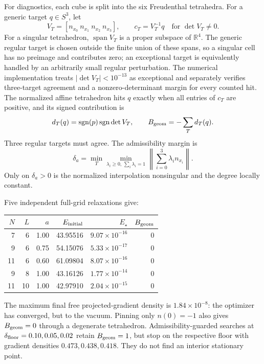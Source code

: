 \documentclass[11pt]{article}
\numberwithin{equation}{section}
\newcommand{\RR}{\mathbb R}
\begin{document}
For diagnostics, each cube is split into the six Freudenthal tetrahedra.  For
a generic target \(q\in S^3\), let
\begin{equation}
 V_T=[n_{x_0}\ n_{x_1}\ n_{x_2}\ n_{x_3}],\qquad
 c_T=V_T^{-1}q\quad\text{for }\det V_T\ne0.
\end{equation}
For a singular tetrahedron, \(\operatorname{span}V_T\) is a proper subspace
of \(\RR^4\).  The generic regular target is chosen outside the finite union
of these spans, so a singular cell has no preimage and contributes zero; an
exceptional target is equivalently handled by an arbitrarily small regular
perturbation.  The numerical implementation treats
\(|\det V_T|<10^{-13}\) as exceptional and separately verifies three-target
agreement and a nonzero-determinant margin for every counted hit.
The normalized affine tetrahedron hits \(q\) exactly when all entries of
\(c_T\) are positive, and its signed contribution is
\begin{equation}
 d_T(q)=\operatorname{sgn}(p)\operatorname{sgn}\det V_T,\qquad
 B_{\rm geom}=-\sum_Td_T(q).
 \label{eq:e7-geometric-degree}
\end{equation}
Three regular targets must agree.  The admissibility margin is
\begin{equation}
 \delta_a=\min_T\min_{\lambda_i\ge0,\,\sum_i\lambda_i=1}
 \left\|\sum_{i=0}^3\lambda_i n_{x_i}\right\|.
 \label{eq:e7-admissibility}
\end{equation}
Only on \(\delta_a>0\) is the normalized interpolation nonsingular and the
degree locally constant.

Five independent full-grid relaxations give:
\begin{center}
\begin{tabular}{rrrrrr}
\toprule
\(N\)&\(L\)&\(a\)&\(E_{\rm initial}\)&\(E_\star\)&\(B_{\rm geom}\)\\
\midrule
7&6&1.00&43.95516&\(9.07\times10^{-16}\)&0\\
9&6&0.75&54.15076&\(5.33\times10^{-17}\)&0\\
11&6&0.60&61.09804&\(8.07\times10^{-16}\)&0\\
9&8&1.00&43.16126&\(1.77\times10^{-14}\)&0\\
11&10&1.00&42.97910&\(2.04\times10^{-15}\)&0\\
\bottomrule
\end{tabular}
\end{center}
The maximum final free projected-gradient density is
\(1.84\times10^{-8}\): the optimizer has converged, but to the vacuum.
Pinning only \(n(0)=-1\) also gives \(B_{\rm geom}=0\) through a degenerate
tetrahedron.  Admissibility-guarded searches at
\(\delta_{\rm floor}=0.10,0.05,0.02\) retain \(B_{\rm geom}=1\), but stop on
the respective floor with gradient densities \(0.473,0.438,0.418\).  They do
not find an interior stationary point.
\end{document}
